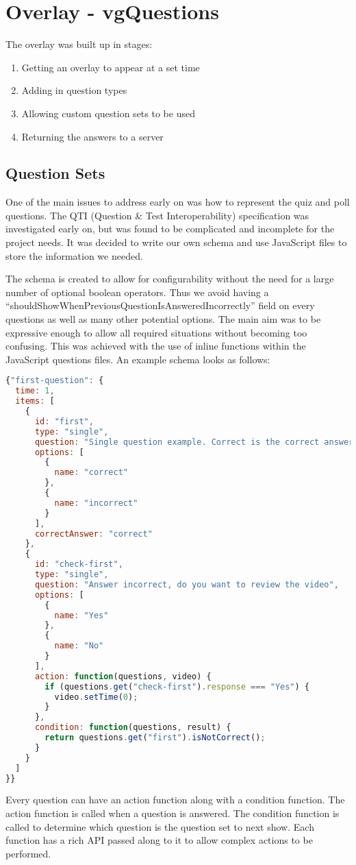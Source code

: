 \chapter{Overlay - vgQuestions} \label{Chapter:Overlay}
The overlay was built up in stages:
\begin{enumerate}
\item Getting an overlay to appear at a set time
\item Adding in question types
\item Allowing custom question sets to be used
\item Returning the answers to a server
\end{enumerate}
\section{Question Sets} 
\label{Section:Question sets}
One of the main issues to address early on was how to represent the quiz and poll questions. The QTI (Question \& Test Interoperability) specification was investigated early on, but was found to be complicated and incomplete for the project needs. It was decided to write our own schema and use JavaScript files to store the information we needed. 

The schema is created to allow for configurability without the need for a large number of optional boolean operators. Thus we avoid having a ``shouldShowWhenPreviousQuestionIsAnsweredIncorrectly'' field on every questions as well as many other potential options. The main aim was to be expressive enough to allow all required situations without becoming too confusing. This was achieved with the use of inline functions within the JavaScript questions files. An example schema looks as follows:
\begin{lstlisting}[language=javascript]
{"first-question": {
  time: 1,
  items: [
    {
      id: "first",
      type: "single",
      question: "Single question example. Correct is the correct answer",
      options: [
        {
          name: "correct"
        },
        {
          name: "incorrect"
        }
      ],
      correctAnswer: "correct"
    },
    {
      id: "check-first",
      type: "single",
      question: "Answer incorrect, do you want to review the video",
      options: [
        {
          name: "Yes"
        },
        {
          name: "No"
        }
      ],
      action: function(questions, video) {
        if (questions.get("check-first").response === "Yes") {
          video.setTime(0);
        }
      },
      condition: function(questions, result) {
        return questions.get("first").isNotCorrect();
      }
    }
  ]
}}
\end{lstlisting}
Every question can have an action function along with a condition function. The action function is called when a question is answered. The condition function is called to determine which question is the question set to next show. Each function has a rich API passed along to it to allow complex actions to be performed.

